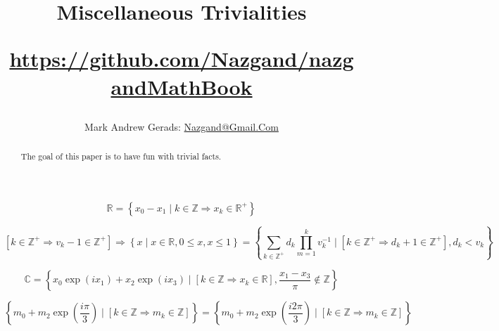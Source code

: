 \documentclass[]{article}
\author{Mark Andrew Gerads: \href{MailTo:Nazgand@Gmail.Com}{Nazgand@Gmail.Com}}
\title{
	Miscellaneous Trivialities
	
	\href{https://github.com/Nazgand/nazgandMathBook}{https://github.com/Nazgand/nazgandMathBook}
}
\newcommand{\pqty}[1]{{\left(#1\right)}}
\newcommand{\Bqty}[1]{{\left\{#1\right\}}}
\newcommand{\bqty}[1]{{\left[#1\right]}}
\numberwithin{equation}{section}
\begin{document}
	
	\maketitle
	
	\begin{abstract}
		The goal of this paper is to have fun with trivial facts.
	\end{abstract}
	
	
	\begin{equation}
		\mathbb{R} = \Bqty{x_0-x_1 \mid k\in\mathbb{Z}\Rightarrow x_k\in\mathbb{R}^+}
	\end{equation}
	
	\begin{equation}
		\bqty{k\in\mathbb{Z}^+\Rightarrow v_k-1\in\mathbb{Z}^+}
		\Rightarrow
		\Bqty{x \mid x\in\mathbb{R},0\leq x,x\leq 1}=
		\Bqty{\sum_{k\in\mathbb{Z}^+} d_k \prod_{m=1}^{k} v_k^{-1} \mid \bqty{k\in\mathbb{Z}^+\Rightarrow d_k+1\in\mathbb{Z}^+},d_k<v_k}
	\end{equation}

	\begin{equation}
		\mathbb{C} = \Bqty{x_0\exp\pqty{ix_1} + x_2\exp\pqty{ix_3} \mid \bqty{k\in\mathbb{Z}\Rightarrow x_k\in\mathbb{R}}, \frac{x_1-x_3}{\pi}\notin\mathbb{Z}}
	\end{equation}
	
	\begin{equation}
		\Bqty{m_0 + m_2\exp\pqty{\frac{i\pi}{3}} \mid \bqty{k\in\mathbb{Z}\Rightarrow m_k\in\mathbb{Z}}}
		=
		\Bqty{m_0 + m_2\exp\pqty{\frac{i2\pi}{3}} \mid \bqty{k\in\mathbb{Z}\Rightarrow m_k\in\mathbb{Z}}}
	\end{equation}
\end{document}
